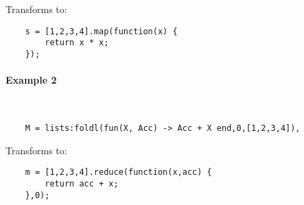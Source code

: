 Transforms to:

\begin{lstlisting}
    s = [1,2,3,4].map(function(x) {
        return x * x;
    });
\end{lstlisting}

\paragraph{\bf Example 2}\ 

\vspace{1\baselineskip}
\begin{lstlisting}
    M = lists:foldl(fun(X, Acc) -> Acc + X end,0,[1,2,3,4]),
\end{lstlisting}

Transforms to:

\begin{lstlisting}
    m = [1,2,3,4].reduce(function(x,acc) {
        return acc + x;
    },0);
\end{lstlisting}
